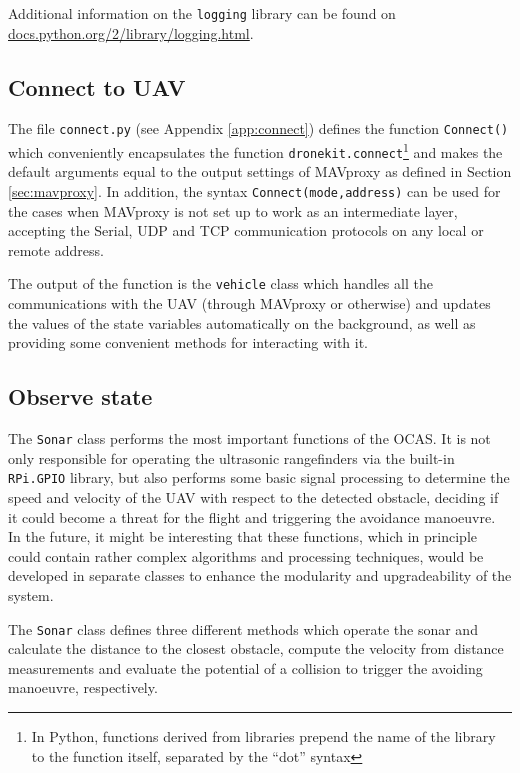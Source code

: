 Additional information on the \texttt{logging} library can be found on \url{docs.python.org/2/library/logging.html}.

\subsection{Connect to UAV} \label{sec:connect}

The file \texttt{connect.py} (see Appendix \ref{app:connect}) defines the function \texttt{Connect()} which conveniently encapsulates the function \texttt{dronekit.connect}\footnote{In Python, functions derived from libraries prepend the name of the library to the function itself, separated by the ``dot'' syntax} and makes the default arguments equal to the output settings of MAVproxy as defined in Section \ref{sec:mavproxy}.
In addition, the syntax \texttt{Connect(mode,address)} can be used for the cases when MAVproxy is not set up to work as an intermediate layer, accepting the Serial, UDP and TCP communication protocols on any local or remote address.

The output of the function is the \texttt{vehicle} class which handles all the communications with the UAV (through MAVproxy or otherwise) and updates the values of the state variables automatically on the background, as well as providing some convenient methods for interacting with it.

\subsection{Observe state} \label{sec:sonar}

The \texttt{Sonar} class performs the most important functions of the OCAS.
It is not only responsible for operating the ultrasonic rangefinders via the built-in \texttt{RPi.GPIO} library, but also performs some basic signal processing to determine the speed and velocity of the UAV with respect to the detected obstacle, deciding if it could become a threat for the flight and triggering the avoidance manoeuvre.
In the future, it might be interesting that these functions, which in principle could contain rather complex algorithms and processing techniques, would be developed in separate classes to enhance the modularity and upgradeability of the system.

The \texttt{Sonar} class defines three different methods which operate the sonar and calculate the distance to the closest obstacle, compute the velocity from distance measurements and evaluate the potential of a collision to trigger the avoiding manoeuvre, respectively.

